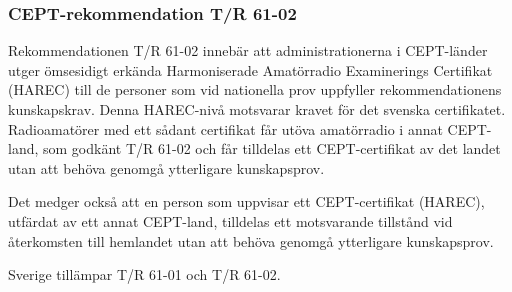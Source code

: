 \subsubsection{CEPT-rekommendation T/R 61-02}

Rekommendationen T/R 61-02 innebär att administrationerna i CEPT-länder utger
ömsesidigt erkända Harmoniserade Amatörradio Examinerings Certifikat (HAREC)
till de personer som vid nationella prov uppfyller rekommendationens
kunskapskrav. Denna HAREC-nivå motsvarar kravet för det svenska certifikatet.
Radioamatörer med ett sådant certifikat får utöva amatörradio i annat
CEPT-land, som godkänt T/R 61-02 och får tilldelas ett CEPT-certifikat av det
landet utan att behöva genomgå ytterligare kunskapsprov.

Det medger också att en person som uppvisar ett CEPT-certifikat
(HAREC), utfärdat av ett annat CEPT-land, tilldelas ett motsvarande
tillstånd vid återkomsten till hemlandet utan att behöva genomgå
ytterligare kunskapsprov.

Sverige tillämpar T/R 61-01 och T/R 61-02.


